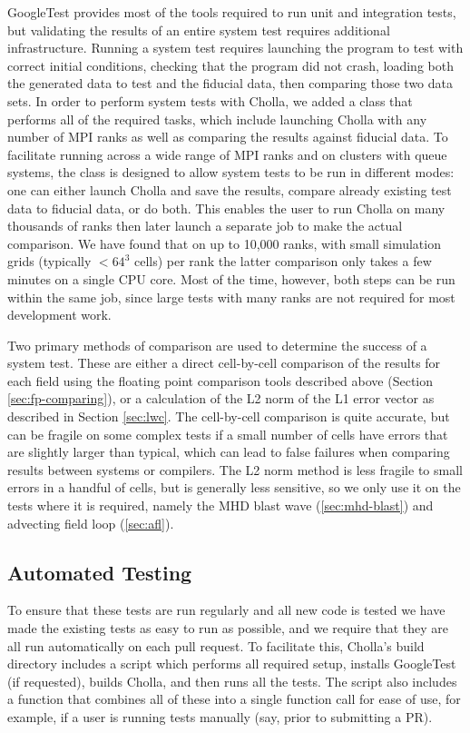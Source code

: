 \documentclass[modern, linenumbers]{aastex631}
\begin{document}
GoogleTest provides most of the tools required to run unit and integration tests, but validating the results of an entire system test requires additional infrastructure. Running a system test requires launching the program to test with correct initial conditions, checking that the program did not crash, loading both the generated data to test and the fiducial data, then comparing those two data sets. In order to perform system tests with Cholla, we added a class that performs all of the required tasks, which include launching Cholla with any number of MPI ranks as well as comparing the results against fiducial data. To facilitate running across a wide range of MPI ranks and on clusters with queue systems, the class is designed to allow system tests to be run in different modes: one can either launch Cholla and save the results, compare already existing test data to fiducial data, or do both. This enables the user to run Cholla on many thousands of ranks then later launch a separate job to make the actual comparison. We have found that on up to 10,000 ranks, with small simulation grids (typically $<64^3$ cells) per rank the latter comparison only takes a few minutes on a single CPU core. Most of the time, however, both steps can be run within the same job, since large tests with many ranks are not required for most development work.

Two primary methods of comparison are used to determine the success of a system test. These are either a direct cell-by-cell comparison of the results for each field using the floating point comparison tools described above (Section \ref{sec:fp-comparing}), or a calculation of the L2 norm of the L1 error vector as described in Section \ref{sec:lwc}. The cell-by-cell comparison is quite accurate, but can be fragile on some complex tests if a small number of cells have errors that are slightly larger than typical, which can lead to false failures when comparing results between systems or compilers. The L2 norm method is less fragile to small errors in a handful of cells, but is generally less sensitive, so we only use it on the tests where it is required, namely the MHD blast wave (\autoref{sec:mhd-blast}) and advecting field loop (\autoref{sec:afl}).

\subsection{Automated Testing}

To ensure that these tests are run regularly and all new code is tested we have made the existing tests as easy to run as possible, and we require that they are all run automatically on each pull request. To facilitate this, Cholla's build directory includes a script which performs all required setup, installs GoogleTest (if requested), builds Cholla, and then runs all the tests. The script also includes a function that combines all of these into a single function call for ease of use, for example, if a user is running tests manually (say, prior to submitting a PR).
\end{document}

